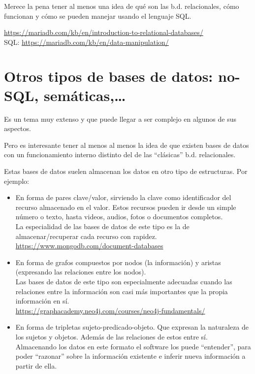 \documentclass[spanish,12pt,a4paper,final,oneside]{book}
\begin{document}
Merece la pena tener al menos una idea de qué son las b.d. relacionales, cómo funcionan y cómo se pueden manejar usando el lenguaje SQL.

\url{https://mariadb.com/kb/en/introduction-to-relational-databases/}
\\ SQL: \url{https://mariadb.com/kb/en/data-manipulation/}


\section{Otros tipos de bases de datos: no-SQL, semáticas,\ldots}
Es un tema muy extenso y que puede llegar a ser complejo en algunos de sus aspectos.

Pero es interesante tener al menos al menos la idea de que existen bases de datos con un funcionamiento interno distinto del de las ``clásicas'' b.d. relacionales.

Estas bases de datos suelen almacenan los datos en otro tipo de estructuras. Por ejemplo:
\begin{itemize}

\item En forma de pares clave/valor, sirviendo la clave como identificador del recurso almacenado en el valor. Estos recursos pueden ir desde un simple número o texto, hasta videos, audios, fotos o documentos completos.
\\La especialidad de las bases de datos de este tipo es la de almacenar/recuperar cada recurso con rapidez.
\\ \url{https://www.mongodb.com/document-databases}

\item En forma de grafos compuestos por nodos (la información) y aristas (expresando las relaciones entre los nodos).
\\Las bases de datos de este tipo son especialmente adecuadas cuando las relaciones entre la información son casi más importantes que la propia información en sí.
\\ \url{https://graphacademy.neo4j.com/courses/neo4j-fundamentals/} 

\item En forma de tripletas sujeto-predicado-objeto. Que expresan la naturaleza de los sujetos y objetos. Además de las relaciones de estos entre sí. 
\\Almacenando los datos en este formato el software los puede ``entender'', para poder ``razonar'' sobre la información existente e inferir nueva información a partir de ella.


\end{itemize}
\end{document}
